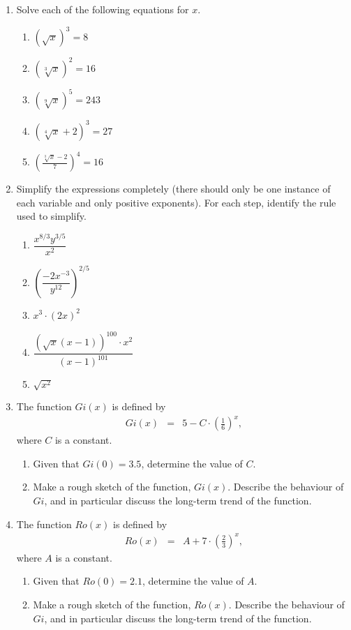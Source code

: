 \begin{enumerate}
\item Solve each of the following equations for $x$.
  \begin{enumerate}
  \item $\left(\sqrt{x}\right)^3=8$
  \item $\left(\sqrt[3]{x}\right)^2=16$
  \item $\left(\sqrt[9]{x}\right)^5=243$
  \item $\left(\sqrt[4]{x}+2\right)^3=27$
  \item $\left(\frac{\sqrt[3]{x}-2}{7}\right)^4=16$
  \end{enumerate}
\item Simplify the expressions completely (there should only be one
  instance of each variable and only positive exponents). For each
  step, identify the rule used to simplify.
  \begin{enumerate}
  \item $\dfrac{x^{8/3}y^{3/5}}{x^2}$
  \item $\left( \dfrac{-2x^{-3}}{y^{12} }  \right)^{2/5}$
  \item $x^3 \cdot (2x)^2$
  \item $\dfrac{(\sqrt{x}(x-1))^{100} \cdot x^2}{(x-1)^{101}}$ 
  \item $\sqrt{x^2}$
  \end{enumerate}

\item The function $Gi(x)$ is defined by
  \begin{eqnarray*}
    Gi(x) & = & 5-C \cdot \left(\frac{1}{6}\right)^x,
  \end{eqnarray*}
  where $C$ is a constant.
  \begin{enumerate}
  \item Given that $Gi(0)=3.5$, determine the value of $C$.
  \item Make a rough sketch of the function, $Gi(x)$. Describe the
    behaviour of $Gi$, and in particular discuss the long-term trend
    of the function.
  \end{enumerate}

\item The function $Ro(x)$ is defined by
  \begin{eqnarray*}
    Ro(x) & = & A + 7 \cdot \left(\frac{2}{3}\right)^x,
  \end{eqnarray*}
  where $A$ is a constant.
  \begin{enumerate}
  \item Given that $Ro(0)=2.1$, determine the value of $A$.
  \item Make a rough sketch of the function, $Ro(x)$. Describe the
    behaviour of $Gi$, and in particular discuss the long-term trend
    of the function.
  \end{enumerate}


\end{enumerate}
